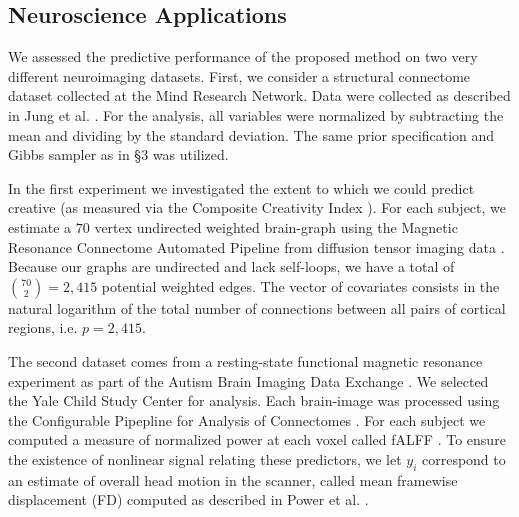 \documentclass{article} %
\providecommand{\mc}[1]{\mathcal{#1}}
\begin{document}


\subsection{Neuroscience Applications} \label{sub:real}

We assessed the predictive performance of the proposed method on two very different neuroimaging datasets. First, we consider a structural connectome dataset collected at the Mind Research Network.  Data were collected as described in Jung et al. \cite{Jung2010}. For the analysis, all variables were normalized by subtracting the mean and dividing by the standard deviation. The same prior specification and Gibbs sampler as in \S 3 was  utilized. 

In the first experiment we investigated the extent to which we could predict creative (as measured via the Composite Creativity Index \cite{Arden2010}).   For each subject, we estimate a $70$ vertex undirected weighted brain-graph using the Magnetic Resonance Connectome Automated Pipeline \cite{MRCAP11} from diffusion tensor imaging data \cite{Mori2006}. Because our graphs are undirected and lack self-loops, we have a total of $\binom{70}{2}=2,415$ potential weighted edges. The vector of covariates consists in the natural logarithm of the total number of connections between all pairs of cortical regions, i.e. $p=2,415$. 

The second dataset comes from a resting-state functional magnetic resonance experiment as part of the Autism Brain Imaging Data Exchange \cite{Autism}.  We selected the Yale Child Study Center for analysis.  Each brain-image was processed using the Configurable Pipepline for Analysis of Connectomes \cite{cpac}. For each subject we computed a measure of normalized power at each voxel called fALFF \cite{Zou2008}.  To ensure the existence of nonlinear signal relating these predictors, we let $y_i$ correspond to an estimate of overall head motion in the scanner, called mean framewise displacement (FD) computed as described in Power et al. \cite{power}. 
\end{document}
